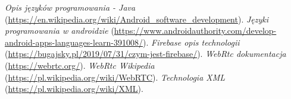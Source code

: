 \documentclass[12pt,a4paper]{article}
\begin{document}
\newpage
\begin{thebibliography}{9}
 {\it Opis języków programowania - Java} (\url{https://en.wikipedia.org/wiki/Android_software_development}).
 {\it Języki programowania w androidzie} (\url{https://www.androidauthority.com/develop-android-apps-languages-learn-391008/}).
 {\it Firebase opis technologii} (\url{https://bugajsky.pl/2019/07/31/czym-jest-firebase/}).
 {\it WebRtc dokumentacja} (\url{https://webrtc.org/}).
 {\it WebRtc Wikipedia} (\url{https://pl.wikipedia.org/wiki/WebRTC}).
 {\it Technologia XML} (\url{https://pl.wikipedia.org/wiki/XML}).
\end{thebibliography}
\end{document}
